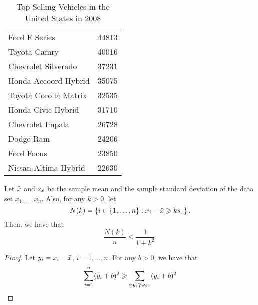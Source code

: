 \begin{example}
  \begin{table}[H]
    \centering
    \begin{tabular}{lr}
      Ford F Series         & 44813 \\
      Toyota Camry          & 40016 \\
      Chevrolet Silverado   & 37231 \\
      Honda Accoord Hybrid  & 35075 \\
      Toyota Corolla Matrix & 32535 \\
      Honda Civic Hybrid    & 31710 \\
      Chevrolet Impala      & 26728 \\
      Dodge Ram             & 24206 \\
      Ford Focus            & 23850 \\
      Nissan Altima Hybrid  & 22630
    \end{tabular}
    \caption{Top Selling Vehicles in the United States in 2008}
    \label{tbl:top-selling-vehicles-in-the-eua-in-2008}
  \end{table}
\end{example}

\begin{theorem}\label{thm:one-sided-chebyshev-inequality}
  Let \(\bar{x}\) and \(s_{x}\) be the sample mean
  and the sample standard deviation of the data set \(x_{1},\ldots,x_{n}\).
  Also, for any \(k>0\), let
  \[
    N(k)
    =
    \left\{
      i\in{\left\{1,\ldots,n\right\}}
      :
      x_{i}-\bar{x}
      \geqslant{ks_{x}}
    \right\}.
  \]
  Then, we have that
  \[
    \frac{N(k)}{n}\leqslant{\frac{1}{1+k^{2}}}.
  \]
\end{theorem}

\begin{proof}
  Let \(y_{i}=x_{i}-\bar{x}\), \(i=1,\ldots,n\). For any \(b>0\), we have
  that
  \begin{align*}
    \sum_{i=1}^{n}(y_{i}+b)^{2}
    &\geqslant
    \sum_{i:y_{i}\geqslant{ks_{x}}}(y_{i}+b)^{2}
    \\
  \end{align*}

\end{proof}

